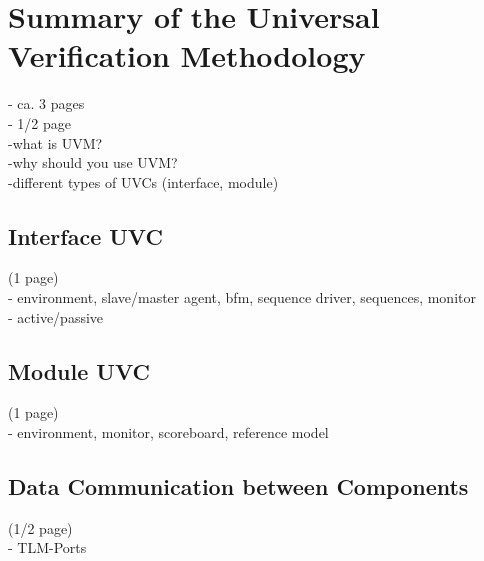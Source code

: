 \section{Summary of the Universal Verification Methodology}\label{uvm}
- ca. 3 pages
\\
- 1/2 page\\
-what is UVM?\\
-why should you use UVM?\\
-different types of UVCs (interface, module)\\
\subsection{Interface UVC} (1 page)\\
- environment, slave/master agent, bfm, sequence driver, sequences, monitor\\
- active/passive\\
\subsection{Module UVC} (1 page)\\
- environment, monitor, scoreboard, reference model\\
\subsection{Data Communication between Components} (1/2 page)\\
- TLM-Ports\\
